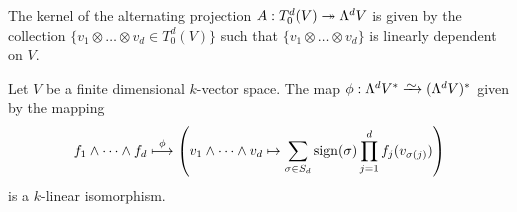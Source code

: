 \begin{corollary}\label{cor:kernel-alternating-projection}
The kernel of the alternating projection \(A: T^d_0(V) \twoheadrightarrow \Lambda^d V\) is
given by the collection \(\{v_{1} \otimes \dots \otimes v_d \in T^d_0(V)\}\)
such that \(\{v_{1} \otimes \dots \otimes v_d\}\) is linearly dependent on
\(V\).
\end{corollary}

\begin{theorem}\label{thm:iso-measure-volume-ext}
Let \(V\) be a finite dimensional \(k\)-vector space. The map \(\phi: \Lambda^d
V^{*} \isoto (\Lambda^dV)^{*}\) given by the mapping
\[
f_1 \wedge \dots \wedge f_d \overset{\phi}\longmapsto \left(
  v_1 \wedge \dots \wedge v_d \mapsto
  \sum_{\sigma \in S_d} \operatorname{sign}(\sigma) \prod_{j=1}^d f_j(v_{\sigma(j)})
\right)
\]
is a \(k\)-linear isomorphism.
\end{theorem}

